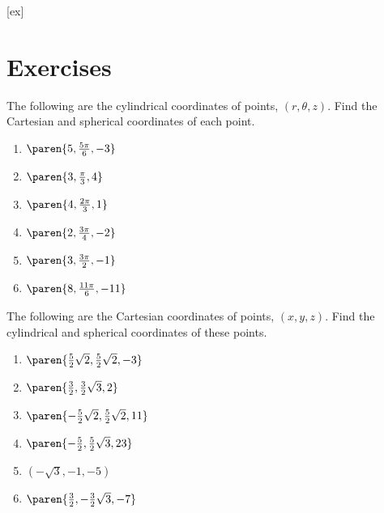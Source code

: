 [ex]
\section*{Exercises}

\begin{enumialphparenastyle}

\begin{ex} The following are the cylindrical coordinates of points, $(
r,\theta,z)$. Find the Cartesian and spherical coordinates of each point.

\begin{enumerate}
\item $\paren{5,\frac{5\pi }{6},-3} $

\item $\paren{3,\frac{\pi }{3},4} $

\item $\paren{4,\frac{2\pi }{3},1} $

\item $\paren{2,\frac{3\pi }{4},-2} $

\item $\paren{3,\frac{3\pi }{2},-1} $

\item $\paren{8,\frac{11\pi }{6},-11} $
\end{enumerate}
\end{ex}

\begin{ex} The following are the Cartesian coordinates of points, $(
x,y,z)$. Find the cylindrical and spherical coordinates of these
points.

\begin{enumerate}
\item $\paren{\frac{5}{2}\sqrt{2},\frac{5}{2}\sqrt{2},-3} $

\item $\paren{\frac{3}{2},\frac{3}{2}\sqrt{3},2} $

\item $\paren{-\frac{5}{2}\sqrt{2},\frac{5}{2}\sqrt{2},11} $

\item $\paren{-\frac{5}{2},\frac{5}{2}\sqrt{3},23} $

\item $(-\sqrt{3},-1,-5) $

\item $\paren{\frac{3}{2},-\frac{3}{2}\sqrt{3},-7} $


\end{enumerate}
\end{ex}
\end{enumialphparenastyle}
